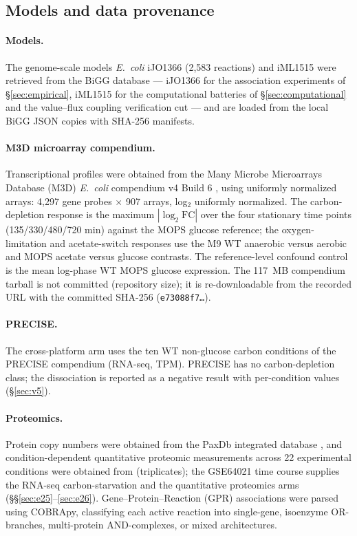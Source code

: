 \documentclass[11pt,a4paper]{article}
\theoremstyle{plain}
\theoremstyle{definition}
\theoremstyle{remark}
\begin{document}
\subsection{Models and data provenance}\label{sec:data}

\paragraph{Models.} The genome-scale models \emph{E.~coli} iJO1366
(2{,}583 reactions) \citep{orth2011} and iML1515 \citep{monk2017}
were retrieved from the BiGG database --- iJO1366 for the association
experiments of \S\ref{sec:empirical}, iML1515 for the computational
batteries of \S\ref{sec:computational} and the value--flux coupling
verification cut --- and are
loaded from the local BiGG JSON copies with SHA-256 manifests.

\paragraph{M3D microarray compendium.} Transcriptional profiles were
obtained from the Many Microbe Microarrays Database (M3D)
\emph{E.~coli} compendium v4 Build 6
\citep{faith2008, faith2007}, using uniformly normalized arrays:
4{,}297 gene probes $\times$ 907
arrays, log$_2$ uniformly normalized. The carbon-depletion response
is the maximum $|\log_2\mathrm{FC}|$ over the four stationary
time points (135/330/480/720 min) against the MOPS glucose
reference; the oxygen-limitation and acetate-switch responses use
the M9 WT anaerobic versus aerobic and MOPS acetate versus glucose
contrasts. The reference-level confound control is the mean
log-phase WT MOPS glucose expression. The 117~MB compendium
tarball is not committed (repository size); it is re-downloadable
from the recorded URL with the committed SHA-256
(\texttt{e73088f7\allowbreak\ldots}).

\paragraph{PRECISE.} The cross-platform arm uses the ten WT
non-glucose carbon conditions of the PRECISE compendium
\citep{sastry2019} (RNA-seq, TPM). PRECISE has no carbon-depletion class; the dissociation is reported as a negative result with per-condition values (\S\ref{sec:v5}).

\paragraph{Proteomics.} Protein copy numbers were obtained from the
PaxDb integrated database \citep{wang2015}, and
condition-dependent quantitative proteomic measurements across 22
experimental conditions were obtained from \citet{schmidt2016}
(triplicates); the GSE64021
\citep{barrett2013} time course supplies the RNA-seq
carbon-starvation and the quantitative proteomics arms (\S\S\ref{sec:e25}--\ref{sec:e26}).
Gene--Protein--Reaction (GPR) associations were parsed using
COBRApy, classifying each active reaction into single-gene,
isoenzyme OR-branches, multi-protein AND-complexes, or mixed
architectures.
\end{document}

